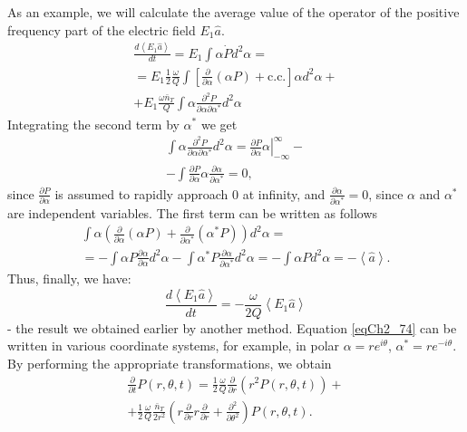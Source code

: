 As an example, we will calculate the average value of the operator of the positive frequency part of the electric field $E_1\hat{a}$.   
\begin{eqnarray}
\frac{d \left<E_1\hat{a}\right>}{d t} = 
E_1\int \alpha \dot{P}d^2 \alpha =
\nonumber \\
=E_1 \frac{1}{2}\frac{\omega}{Q}
\int \left[
\frac{\partial}{\partial \alpha}\left(\alpha P\right) + \text{c.c.}
\right]\alpha d^2 \alpha +
\nonumber \\
+E_1\frac{\omega \bar{n}_T}{Q}\int \alpha
\frac{\partial^2 P}{\partial \alpha \partial \alpha^{*}}
d^2 \alpha
\label{eqCh2_75}
\end{eqnarray}
Integrating the second term by $\alpha^{*}$ we get
\begin{eqnarray}
\int\alpha\frac{\partial^2 P}{\partial \alpha \partial \alpha^{*}}
d^2 \alpha = 
\left.\frac{\partial P}{\partial
  \alpha}\alpha\right|_{-\infty}^{\infty} - 
\nonumber \\
- \int \frac{\partial P}{\partial \alpha} \alpha
\frac{\partial \alpha}{\partial \alpha^{*}} = 0,
\nonumber
\end{eqnarray}
since $\frac{\partial P}{\partial \alpha}$ is assumed to rapidly
approach 0 at infinity, and 
$\frac{\partial \alpha}{\partial \alpha^{*}} = 0$, since 
$\alpha$ and $\alpha^{*}$ are independent variables.
The first term can be written as follows
\begin{eqnarray}
\int \alpha \left(
\frac{\partial}{\partial \alpha}\left(\alpha P\right) + 
\frac{\partial}{\partial \alpha^{*}}\left(\alpha^{*} P\right)
\right) d^2 \alpha = 
\nonumber \\
= - \int \alpha P \frac{\partial \alpha}{\partial \alpha} d^2 \alpha -
\int \alpha^{*} P \frac{\partial \alpha}{\partial \alpha^{*}} d^2 \alpha  
= - \int \alpha P  d^2 \alpha
= - \left<\hat{a}\right>.
\nonumber
\end{eqnarray}
Thus, finally, we have: 
\begin{equation}
\frac{d \left<E_1\hat{a}\right>}{d t} = 
-\frac{\omega}{2 Q}\left<E_1\hat{a}\right>
\label{eqCh2_76}
\end{equation}
- the result we obtained earlier by another method. Equation \eqref{eqCh2_74} can be written in various coordinate systems, for example, in polar $\alpha = r e^{i \theta}$, $\alpha^{*} = r e^{- i \theta}$. By performing the appropriate transformations, we obtain 
\begin{eqnarray}
\frac{\partial}{\partial t}P\left(r, \theta, t\right) = 
\frac{1}{2}\frac{\omega}{Q}
\frac{\partial}{\partial r}
\left(r^2 P\left(r, \theta, t\right)\right) +
\nonumber \\
+ \frac{1}{2}\frac{\omega}{Q}
\frac{\bar{n}_T}{2 r^2}
\left(
r \frac{\partial}{\partial r} r \frac{\partial}{\partial r} +
\frac{\partial^2}{\partial \theta^2}
\right)
P\left(r, \theta, t\right).
\label{eqCh2_77}
\end{eqnarray}
